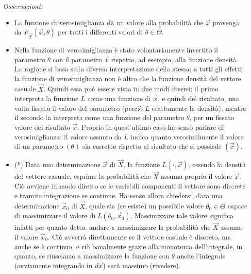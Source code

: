 \textit{Osservazioni:} \begin{itemize}

\item La funzione di verosimiglianza dà un valore alla probabilità che $\vec{x}$ provenga da $F_{\vec{X}}(\vec{x},\theta)$ per tutti i differenti valori di $\theta\in \Theta$.


\item Nella funzione di verosimiglianza è stato volontariamente invertito il parametro $\theta$ con il parametro $\vec{x}$ rispetto, ad esempio, alla funzione densità. La ragione si basa sulla diversa interpretazione della stessa: a tutti gli effetti la funzione di verosimiglianza non è altro che la funzione densità del vettore casuale $\vec{X}$. Quindi essa può essere vista in due modi diversi: il primo interpreta la funzione $L$ come una funzione di $\vec{x}$, e quindi del risultato, una volta fissato il valore del parametro (perciò $L$ esattamente la densità), mentre il secondo la interpreta come una funzione del parametro $\theta$, per un fissato valore del risultato $\vec{x}$. Proprio in quest'ultimo caso ha senso parlare di verosimiglianza: il valore assunto da $L$ indica quanto verosimilmente il valore di un parametro $(\theta)$ sia corretto rispetto al risultato che si possiede $(\vec{x})$. 

\item (*) Data una determinazione $\vec{x}$ di $\vec{X}$, la funzione $L(\cdot, \vec{x})$, essendo la densità del vettore casuale, esprime la probabilità che $\vec{X}$ assuma proprio il valore $\vec{x}$. Ciò avviene in modo diretto se le variabili componenti il vettore sono discrete e tramite integrazione se continue. Ha senso allora chiedersi, data una determinazione $\vec{x}_0$ di $\vec{X}$, quale sia (se esiste) un possibile valore $\theta_0\in \Theta$ capace di massimizzare il valore di $L(\theta_0,\vec{x}_0)$. Massimizzare tale valore significa infatti per quanto detto, andare a massimizzare la probabilità che $\vec{X}$ assuma il valore $\vec{x}_0$. Ciò avverrà direttamente se il vettore casuale è discreto, ma anche se è continuo, e ciò banalmente grazie alla monotonia dell'integrale, in quanto, se riusciamo a massimizzare la funzione con $\theta$ anche l'integrale (ovviamente integrando in $d\vec{x}$) sarà massimo (rivedere).


\end{itemize}
